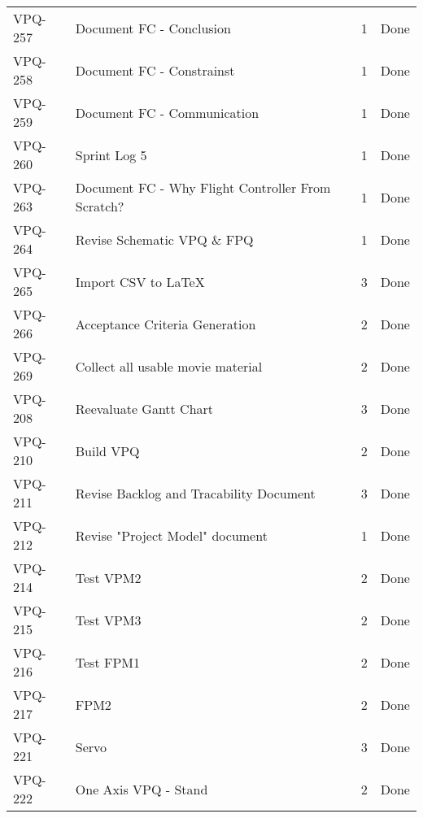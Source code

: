 \begin{table}[ht]
\begin{tabularx}{\linewidth}{|m{1.5cm} m{8.3cm} m{1.5cm} m{3.5cm}|}
\rowcolor{gainsboro} VPQ-257 & Document FC - Conclusion & 1\centering & Done  \\    
      VPQ-258 & Document FC - Constrainst & 1\centering & Done  \\
\rowcolor{gainsboro}  VPQ-259 & Document FC - Communication & 1\centering & Done  \\
      VPQ-260 & Sprint Log 5 & 1\centering & Done  \\
\rowcolor{gainsboro} VPQ-263 & Document FC - Why Flight Controller From Scratch? & 1\centering & Done  \\    
      VPQ-264 & Revise Schematic VPQ \& FPQ & 1\centering & Done  \\
\rowcolor{gainsboro}  VPQ-265 & Import CSV to LaTeX & 3\centering & Done  \\
      VPQ-266 & Acceptance Criteria Generation & 2\centering & Done  \\
\rowcolor{gainsboro} VPQ-269 & Collect all usable movie material & 2\centering & Done  \\    
      VPQ-208 & Reevaluate Gantt Chart & 3\centering & Done  \\
\rowcolor{gainsboro}  VPQ-210 &  Build VPQ & 2\centering & Done  \\
      VPQ-211 & Revise Backlog and Tracability Document & 3\centering & Done  \\
\rowcolor{gainsboro} VPQ-212 & Revise "Project Model" document & 1\centering & Done  \\    
      VPQ-214 & Test VPM2 & 2\centering & Done  \\
\rowcolor{gainsboro}  VPQ-215 & Test VPM3 & 2\centering & Done  \\
      VPQ-216 & Test FPM1 & 2\centering & Done  \\
\rowcolor{gainsboro} VPQ-217 & FPM2 & 2\centering & Done  \\    
      VPQ-221 & Servo & 3\centering & Done  \\
\rowcolor{gainsboro}  VPQ-222 &  One Axis VPQ - Stand & 2\centering & Done  \\

\hline    
\end{tabularx}
\end{table}


